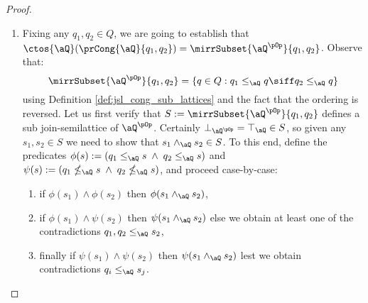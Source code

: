 \documentclass{article}
\begin{document}
\begin{proof}
\item
\begin{enumerate}
\item
Fixing any $q_1, q_2 \in Q$, we are going to establish that $\ctos{\aQ}(\prCong{\aQ}{q_1,q_2}) = \mirrSubset{\aQ^{\pOp}}{q_1,q_2}$. Observe that:
\[
\mirrSubset{\aQ^{\pOp}}{q_1,q_2} = \{ q \in Q : q_1 \leq_\aQ q \siff q_2 \leq_\aQ q \}
\]
using Definition \ref{def:jsl_cong_sub_lattices} and the fact that the ordering is reversed. Let us first verify that $S := \mirrSubset{\aQ^{\pOp}}{q_1,q_2}$ defines a sub join-semilattice of $\aQ^{\pOp}$. Certainly $\bot_{\aQ^{\pOp}} =  \top_\aQ \in S$, so given any $s_1, s_2 \in S$ we need to show that $s_1 \land_\aQ s_2 \in S$. To this end, define the predicates $\phi(s) := (q_1 \leq_\aQ s \;\land\; q_2 \leq_\aQ s)$ and $\psi(s) := (q_1 \nleq_\aQ s \;\land\; q_2 \nleq_\aQ s)$, and proceed case-by-case:
\begin{enumerate}
\item
if $\phi(s_1) \land \phi(s_2)$ then $\phi(s_1 \land_\aQ s_2)$,

\item
if $\phi(s_1) \land \psi(s_2)$ then $\psi(s_1 \land_\aQ s_2)$ else we obtain at least one of the contradictions $q_1, q_2 \leq_\aQ s_2$,

\item
finally if $\psi(s_1) \land \psi(s_2)$ then $\psi(s_1 \land_\aQ s_2)$ lest we obtain contradictions $q_i \leq_\aQ s_j$.

\end{enumerate}


\end{enumerate}
\end{proof}
\end{document}
